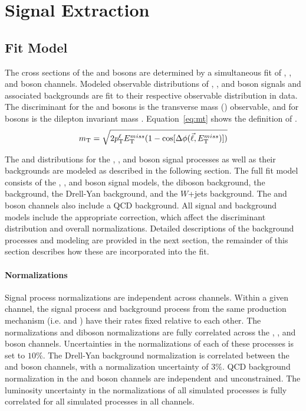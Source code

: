 \chapter{Signal Extraction}\label{ch:sig}
\section{Fit Model}\label{ch:sig:fit}
The cross sections of the \Wpm and \Z bosons are determined by a simultaneous fit of \Wp, \Wm, and \Z boson channels. Modeled observable distributions of \Wp, \Wm, and \Z boson signals and associated backgrounds are fit to their respective observable distribution in data. The discriminant for the \Wp and \Wm bosons is the transverse mass (\mt) observable, and for \Z bosons is the dilepton invariant mass \mll. Equation~\ref{eq:mt} shows the definition of \mt.
\begin{equation}
m_{\mathrm{T}} = \sqrt{ 2 p_{\mathrm{T}}^{\ell} E_{\mathrm{T}}^{miss} ( 1 - \cos[\Delta\phi( {\vec \ell},E_{\mathrm{T}}^{miss} ) ] ) }
\label{eq:mt}
\end{equation}

The \mll and \mt distributions for the \Wp, \Wm, and \Z boson signal processes as well as their backgrounds are modeled as described in the following section. 
The full fit model consists of the \Wp, \Wm, and \Z boson signal models, the diboson background, the \ttbar background, the Drell-Yan background, and the $W$+jets background. The \Wp and \Wm boson channels also include a QCD background. All signal and background models include the appropriate correction, which affect the discriminant distribution and overall normalizations. Detailed descriptions of the background processes and modeling are provided in the next section, the remainder of this section describes how these are incorporated into the  fit. 
\subsubsection{Normalizations}
Signal process normalizations are independent across channels. Within a given channel, the signal process and background process from the same production mechanism (i.e. \wmunu and \wtau) have their rates fixed relative to each other. The \ttbar normalizations and diboson normalizations are fully correlated across the \Wp, \Wm, and \Z boson channels. Uncertainties in the normalizations of each of these processes is set to $10\%$. The Drell-Yan background normalization is correlated between the \Wp and \Wm boson channels, with a normalization uncertainty of $3\%$. QCD background normalization in the \Wp and \Wm boson channels are independent and unconstrained. The luminosity uncertainty in the normalizations of all simulated processes is fully correlated for all simulated processes in all channels. 


